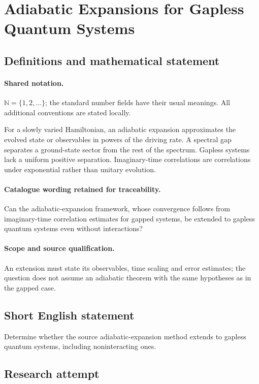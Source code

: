 \documentclass[11pt]{article}
\begin{document}
\section{Adiabatic Expansions for Gapless Quantum Systems}\label{statement}

\subsection{Definitions and mathematical statement}

\paragraph{Shared notation.}$\mathbb N=\{1,2,\ldots\}$; the standard number fields have their usual meanings. All additional conventions are stated locally.


For a slowly varied Hamiltonian, an adiabatic expansion approximates the evolved state or observables in powers of the driving rate. A spectral gap separates a ground-state sector from the rest of the spectrum. Gapless systems lack a uniform positive separation. Imaginary-time correlations are correlations under exponential rather than unitary evolution.

\paragraph{Catalogue wording retained for traceability.}
Can the adiabatic-expansion framework, whose convergence follows from imaginary-time correlation estimates for gapped systems, be extended to gapless quantum systems even without interactions?

\paragraph{Scope and source qualification.}An extension must state its observables, time scaling and error estimates; the question does not assume an adiabatic theorem with the same hypotheses as in the gapped case.
\subsection{Short English statement}
Determine whether the source adiabatic-expansion method extends to gapless quantum systems, including noninteracting ones.
\subsection{Research attempt}
\end{document}
